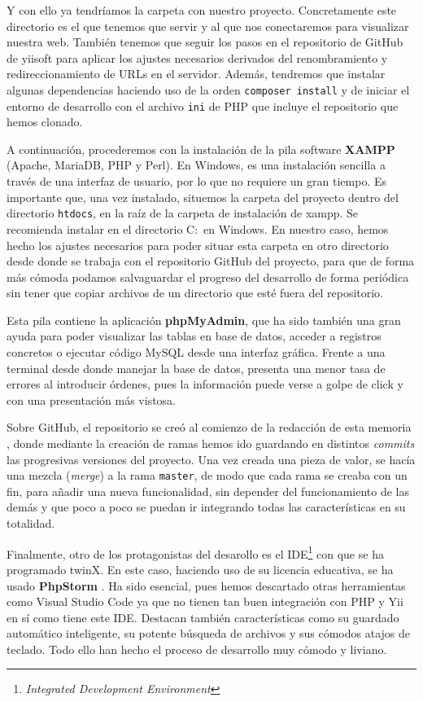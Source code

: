 Y con ello ya tendríamos la carpeta con nuestro proyecto. Concretamente este directorio es el que tenemos que servir y al que nos conectaremos para visualizar nuestra web. También tenemos que seguir los pasos en el repositorio de GitHub de yiisoft para aplicar los ajustes necesarios derivados del renombramiento y redireccionamiento de URLs en el servidor. Además, tendremos que instalar algunas dependencias haciendo uso de la orden \texttt{composer install} y de iniciar el entorno de desarrollo con el archivo \texttt{ini} de PHP que incluye el repositorio que hemos clonado.

A continuación, procederemos con la instalación de la pila software \textbf{XAMPP} (Apache, MariaDB, PHP y Perl). En Windows, es una instalación sencilla a través de una interfaz de usuario, por lo que no requiere un gran tiempo. Es importante que, una vez instalado, situemos la carpeta del proyecto dentro del directorio \texttt{htdocs}, en la raíz de la carpeta de instalación de xampp. Se recomienda instalar en el directorio C:\ en Windows. En nuestro caso, hemos hecho los ajustes necesarios para poder situar esta carpeta en otro directorio desde donde se trabaja con el repositorio GitHub del proyecto, para que de forma más cómoda podamos salvaguardar el progreso del desarrollo de forma periódica sin tener que copiar archivos de un directorio que esté fuera del repositorio.

Esta pila contiene la aplicación \textbf{phpMyAdmin}, que ha sido también una gran ayuda para poder visualizar las tablas en base de datos, acceder a registros concretos o ejecutar código MySQL desde una interfaz gráfica. Frente a una terminal desde donde manejar la base de datos, presenta una menor tasa de errores al introducir órdenes, pues la información puede verse a golpe de click y con una presentación más vistosa.

Sobre GitHub, el repositorio se creó  al comienzo de la redacción de esta memoria \cite{repogit}, donde mediante la creación de ramas hemos ido guardando en distintos \textit{commits} las progresivas versiones del proyecto. Una vez creada una pieza de valor, se hacía una mezcla (\textit{merge}) a la rama \texttt{master}, de modo que cada rama se creaba con un fin, para añadir una nueva funcionalidad, sin depender del funcionamiento de las demás y que poco a poco se puedan ir integrando todas las características en su totalidad.

Finalmente, otro de los protagonistas del desarollo es el IDE\footnote{\textit{Integrated Development Environment}} con que se ha programado twinX. En este caso, haciendo uso de su licencia educativa, se ha usado \textbf{PhpStorm} \cite{phpstorm}. Ha sido esencial, pues hemos descartado otras herramientas como Visual Studio Code ya que no tienen tan buen integración con PHP y Yii en sí como tiene este IDE. Destacan también características como su guardado automático inteligente, su potente búsqueda de archivos y sus cómodos atajos de teclado. Todo ello han hecho el proceso de desarrollo muy cómodo y liviano.


